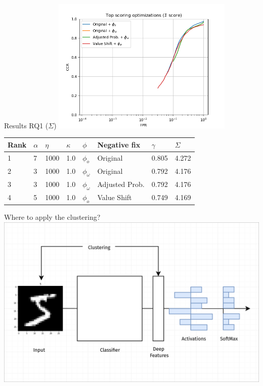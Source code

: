 \begin{frame}{Results RQ1 ($\Sigma$)}
	\centering
	\includegraphics[width=0.65\textwidth]{figures/Top-sigma.png}
	\footnotesize{   \begin{tabularx}{\textwidth}{ |X|X|X|X|X|l|X|X| }
			\hline
			Rank & $\alpha$ & $\eta$ & $\kappa$ & $\phi$        & Negative fix   & $\gamma$ & $\Sigma$ \\
			\hline
			1    & 7        & 1000   & 1.0      & $\phi_o$      & Original       & 0.805    & 4.272    \\
			2    & 3        & 1000   & 1.0      & $\phi_\omega$ & Original       & 0.792    & 4.176    \\
			3    & 3        & 1000   & 1.0      & $\phi_\omega$ & Adjusted Prob. & 0.792    & 4.176    \\
			4    & 5        & 1000   & 1.0      & $\phi_o$      & Value Shift    & 0.749    & 4.169    \\
			\hline
		\end{tabularx}}
\end{frame}

\begin{frame}{Where to apply the clustering?}
	\includegraphics[width=\textwidth]{figures/openmax_clustering.png}
\end{frame}

